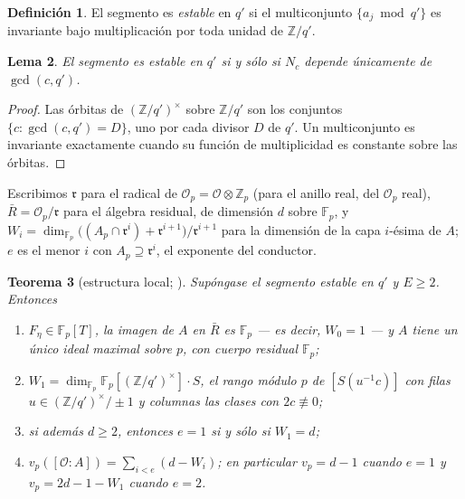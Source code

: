 \documentclass[11pt,a4paper]{article}
\newtheorem{theorem}{Teorema}
\newtheorem{lemma}[theorem]{Lema}
\theoremstyle{definition}
\newtheorem{definition}[theorem]{Definici\'on}
\newcommand{\ZZ}{\mathbb{Z}}
\newcommand{\FF}{\mathbb{F}}
\newcommand{\cO}{\mathcal{O}}
\newcommand{\rad}{\mathfrak{r}}
\begin{document}
\begin{definition}\label{def:est}
El segmento es \emph{estable} en $q'$ si el multiconjunto $\{a_j\bmod q'\}$ es invariante bajo
multiplicaci\'on por toda unidad de $\ZZ/q'$.
\end{definition}

\begin{lemma}\label{lem:est}
El segmento es estable en $q'$ si y s\'olo si $N_c$ depende \'unicamente de $\gcd(c,q')$.
\end{lemma}

\begin{proof}
Las \'orbitas de $(\ZZ/q')^\times$ sobre $\ZZ/q'$ son los conjuntos $\{c:\gcd(c,q')=D\}$, uno por
cada divisor $D$ de $q'$. Un multiconjunto es invariante exactamente cuando su funci\'on de
multiplicidad es constante sobre las \'orbitas.
\end{proof}

Escribimos $\rad$ para el radical de $\cO_p=\cO\otimes\ZZ_p$ (para el anillo real, del $\cO_p$
real), $\bar R=\cO_p/\rad$ para el \'algebra residual, de dimensi\'on $d$ sobre $\FF_p$, y
$W_i=\dim_{\FF_p}\bigl((A_p\cap\rad^i)+\rad^{i+1}\bigr)/\rad^{i+1}$ para la dimensi\'on de la capa
$i$-\'esima de $A$; $e$ es el menor $i$ con $A_p\supseteq\rad^i$, el exponente del conductor.

\begin{theorem}[estructura local; {\cite[Thm.~5]{Cond}}]\label{thm:loc}
Sup\'ongase el segmento estable en $q'$ y $E\ge2$. Entonces
\begin{enumerate}
\item[(a)] $F_\eta\in\FF_p[T]$, la imagen de $A$ en $\bar R$ es $\FF_p$ --- es decir, $W_0=1$ --- y
$A$ tiene un \'unico ideal maximal sobre $p$, con cuerpo residual $\FF_p$;
\item[(b)] $W_1=\dim_{\FF_p}\FF_p[(\ZZ/q')^\times]\cdot S$, el rango m\'odulo $p$ de
$[S(u^{-1}c)]$ con filas $u\in(\ZZ/q')^\times/\pm1$ y columnas las clases con $2c\not\equiv0$;
\item[(c)] si adem\'as $d\ge2$, entonces $e=1$ si y s\'olo si $W_1=d$;
\item[(d)] $v_p([\cO:A])=\sum_{i<e}(d-W_i)$; en particular $v_p=d-1$ cuando $e=1$ y
$v_p=2d-1-W_1$ cuando $e=2$.
\end{enumerate}
\end{theorem}
\end{document}
